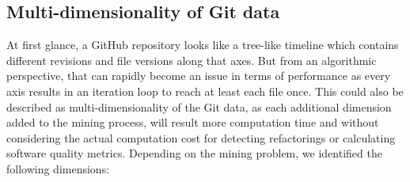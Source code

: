 \subsection{Multi-dimensionality of Git data}
At first glance, a GitHub repository looks like a tree-like timeline which contains different revisions and file versions along that axes. But from an algorithmic perspective, that can rapidly become an issue in terms of performance as every axis results in an iteration loop to reach at least each file once. This could also be described as multi-dimensionality of the Git data, as each additional dimension added to the mining process, will result more computation time and without considering the actual computation cost for detecting refactorings or calculating software quality metrics. Depending on the mining problem, we identified the following dimensions:\\
